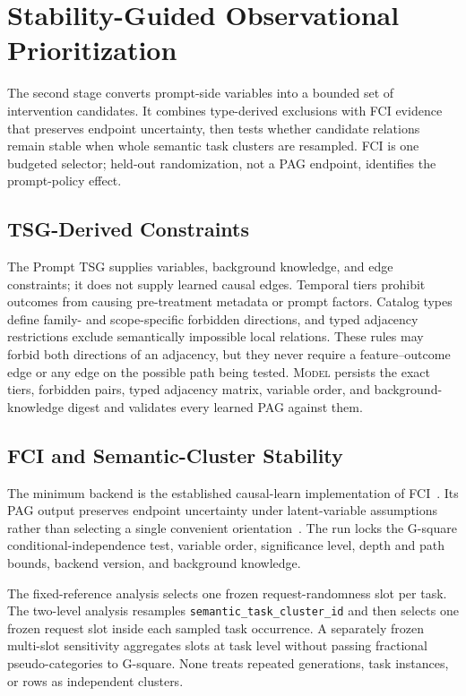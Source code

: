 \documentclass[acmsmall,screen,review,anonymous]{acmart}
\newcommand{\model}{\textsc{Model}\xspace}
\begin{document}
\section{Stability-Guided Observational Prioritization}

The second stage converts prompt-side variables into a bounded set of
intervention candidates. It combines type-derived exclusions with FCI evidence
that preserves endpoint uncertainty, then tests whether candidate relations
remain stable when whole semantic task clusters are resampled. FCI is one
budgeted selector; held-out randomization, not a PAG endpoint, identifies the
prompt-policy effect.

\subsection{TSG-Derived Constraints}

The Prompt TSG supplies variables, background knowledge, and edge constraints;
it does not supply learned causal edges. Temporal tiers prohibit outcomes from
causing pre-treatment metadata or prompt factors. Catalog types define
family- and scope-specific forbidden directions, and typed adjacency
restrictions exclude semantically impossible local relations. These rules may
forbid both directions of an adjacency, but they never require a
feature--outcome edge or any edge on the possible path being tested. \model
persists the exact tiers, forbidden pairs, typed adjacency matrix, variable
order, and background-knowledge digest and validates every learned PAG against
them.

\subsection{FCI and Semantic-Cluster Stability}

The minimum backend is the established causal-learn implementation of
FCI~\cite{spirtes1995fci,zheng2024causallearn}. Its PAG output preserves
endpoint uncertainty under latent-variable assumptions rather than selecting a
single convenient orientation~\cite{zhang2008ancestral}. The run locks the
G-square conditional-independence test, variable order, significance level,
depth and path bounds, backend version, and background knowledge.

The fixed-reference analysis selects one frozen request-randomness slot per
task. The two-level analysis resamples \texttt{semantic\_task\_cluster\_id}
and then selects one frozen request slot inside each sampled task occurrence.
A separately frozen multi-slot sensitivity aggregates slots at task level
without passing fractional pseudo-categories to G-square. None treats repeated
generations, task instances, or rows as independent clusters.
\end{document}
